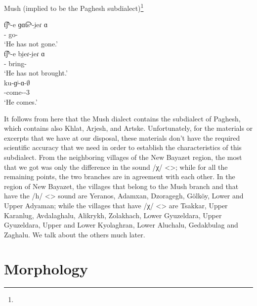 \begin{exe}
	\ex Mush (implied to be the Paghesh subdialect)\footnote{}
	\begin{xlist}
		\ex \gll t͡ʃʰ-e ɡɑt͡sʰ-i̯eɾ ɑ \\
		{\neggloss}-{\aux} go-{\perfcvb} {\aux} \\
		\trans `He has not gone.'\label{sent:Mush:phono:cons:participle:a} \\
		\ex \gll t͡ʃʰ-e bi̯eɾ-i̯eɾ ɑ \\
		{\neggloss}-{\aux} bring-{\perfcvb} {\aux} \\
		\trans `He has not brought.'  \label{sent:Mush:phono:cons:participle:b} \\
		\ex \gll ku-ɡʲ-ɑ-$\emptyset$ \\
		{\ind}-come-{\thgloss}-3{\sg}\\
		\trans `He comes.' \label{sent:Mush:phono:cons:voicepal}\\
	\end{xlist}
\end{exe}

It follows from here that the Mush dialect contains the subdialect of Paghesh, which contains also Khlat, Arjesh, and Artske. Unfortunately, for the materials or excerpts that we have at our disposal, these materials don't have the required scientific accuracy that we need in order to establish the characteristics of this subdialect. From the neighboring villages of the New Bayazet region, the most that we got was only the difference in the sound /χ/ <>; while for all the remaining points, the two branches are in agreement with each other. In the region of New Bayazet, the villages that belong to the Mush branch and that have the /h/ <> sound are Yeranos, Adamxan, Dzoragegh, Gölköy, Lower and Upper Adyaman; while the villages that have /χ/ <> are Tsakkar, Upper Karanlug, Avdalaghalu, Alikrykh, Zolakhach, Lower Gyuzeldara, Upper Gyuzeldara, Upper and Lower Kyolaghran, Lower Aluchalu, Gedakbulag and Zaghalu. We talk about the others much later. 

\section{Morphology}
